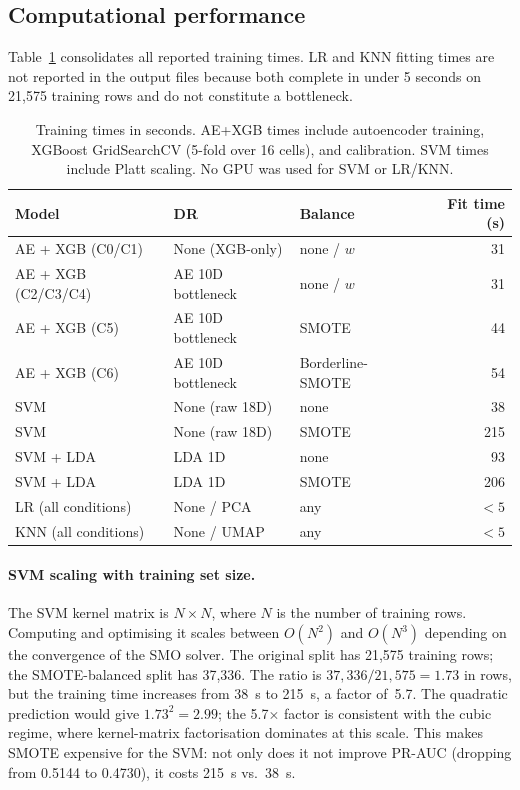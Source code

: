 \documentclass[12pt,a4paper]{article}
\begin{document}
\subsection{Computational performance}

Table~\ref{tab:compute} consolidates all reported training times. LR and KNN
fitting times are not reported in the output files because both complete in
under 5 seconds on 21,575 training rows and do not constitute a bottleneck.

\begin{table}[H]
\centering
\caption{Training times in seconds. AE+XGB times include autoencoder training,
         XGBoost GridSearchCV (5-fold over 16 cells), and calibration. SVM
         times include Platt scaling. No GPU was used for SVM or LR/KNN.}
\label{tab:compute}
\small
\begin{tabular}{lllr}
\toprule
Model & DR & Balance & Fit time (s) \\
\midrule
AE + XGB (C0/C1) & None (XGB-only) & none / $w$ & 31 \\
AE + XGB (C2/C3/C4) & AE 10D bottleneck & none / $w$ & 31 \\
AE + XGB (C5) & AE 10D bottleneck & SMOTE & 44 \\
AE + XGB (C6) & AE 10D bottleneck & Borderline-SMOTE & 54 \\
\midrule
SVM & None (raw 18D) & none & 38 \\
SVM & None (raw 18D) & SMOTE & 215 \\
SVM + LDA & LDA 1D & none & 93 \\
SVM + LDA & LDA 1D & SMOTE & 206 \\
\midrule
LR (all conditions) & None / PCA & any & $<5$ \\
KNN (all conditions) & None / UMAP & any & $<5$ \\
\bottomrule
\end{tabular}
\end{table}

\paragraph{SVM scaling with training set size.}
The SVM kernel matrix is $N \times N$, where $N$ is the number of training
rows. Computing and optimising it scales between $O(N^2)$ and $O(N^3)$
depending on the convergence of the SMO solver. The original split has
21,575 training rows; the SMOTE-balanced split has 37,336. The ratio is
$37{,}336 / 21{,}575 = 1.73$ in rows, but the training time increases from
38~s to 215~s, a factor of~5.7. The quadratic prediction would give
$1.73^2 = 2.99$; the 5.7$\times$ factor is consistent with the cubic regime,
where kernel-matrix factorisation dominates at this scale. This makes
SMOTE expensive for the SVM: not only does it not improve PR-AUC (dropping
from 0.5144 to 0.4730), it costs 215~s vs.\ 38~s.
\end{document}
